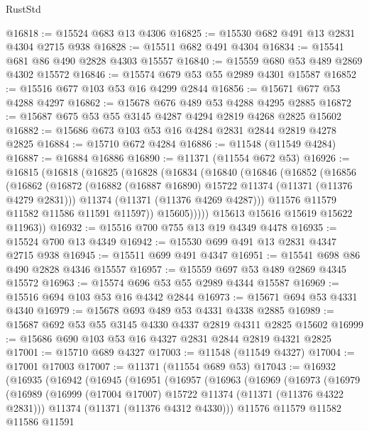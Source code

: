 \begin{lexlean}{RustStd}
\begin{coremodule}
@16818 := @15524 @683 @13 @4306
@16825 := @15530 @682 @491 @13 @2831 @4304 @2715 @938
@16828 := @15511 @682 @491 @4304
@16834 := @15541 @681 @86 @490 @2828 @4303 @15557
@16840 := @15559 @680 @53 @489 @2869 @4302 @15572
@16846 := @15574 @679 @53 @55 @2989 @4301 @15587
@16852 := @15516 @677 @103 @53 @16 @4299 @2844
@16856 := @15671 @677 @53 @4288 @4297
@16862 := @15678 @676 @489 @53 @4288 @4295 @2885
@16872 := @15687 @675 @53 @55 @3145 @4287 @4294 @2819 @4268 @2825 @15602
@16882 := @15686 @673 @103 @53 @16 @4284 @2831 @2844 @2819 @4278 @2825
@16884 := @15710 @672 @4284
@16886 := @11548 (@11549 @4284)
@16887 := @16884 @16886
@16890 := @11371 (@11554 @672 @53)
@16926 := @16815
    (@16818
      (@16825
        (@16828
          (@16834
            (@16840
              (@16846
                (@16852
                  (@16856
                    (@16862
                      (@16872
                        (@16882 (@16887 @16890) @15722 @11374 (@11371 (@11376 @4279 @2831)))
                        @11374
                        (@11371 (@11376 @4269 @4287)))
                      @11576
                      @11579
                      @11582
                      @11586
                      @11591
                      @11597))
                  @15605)))))
        @15613
        @15616
        @15619
        @15622
        @11963))
@16932 := @15516 @700 @755 @13 @19 @4349 @4478
@16935 := @15524 @700 @13 @4349
@16942 := @15530 @699 @491 @13 @2831 @4347 @2715 @938
@16945 := @15511 @699 @491 @4347
@16951 := @15541 @698 @86 @490 @2828 @4346 @15557
@16957 := @15559 @697 @53 @489 @2869 @4345 @15572
@16963 := @15574 @696 @53 @55 @2989 @4344 @15587
@16969 := @15516 @694 @103 @53 @16 @4342 @2844
@16973 := @15671 @694 @53 @4331 @4340
@16979 := @15678 @693 @489 @53 @4331 @4338 @2885
@16989 := @15687 @692 @53 @55 @3145 @4330 @4337 @2819 @4311 @2825 @15602
@16999 := @15686 @690 @103 @53 @16 @4327 @2831 @2844 @2819 @4321 @2825
@17001 := @15710 @689 @4327
@17003 := @11548 (@11549 @4327)
@17004 := @17001 @17003
@17007 := @11371 (@11554 @689 @53)
@17043 := @16932
    (@16935
      (@16942
        (@16945
          (@16951
            (@16957
              (@16963
                (@16969
                  (@16973
                    (@16979
                      (@16989
                        (@16999 (@17004 @17007) @15722 @11374 (@11371 (@11376 @4322 @2831)))
                        @11374
                        (@11371 (@11376 @4312 @4330)))
                      @11576
                      @11579
                      @11582
                      @11586
                      @11591

\end{coremodule}
\end{lexlean}
